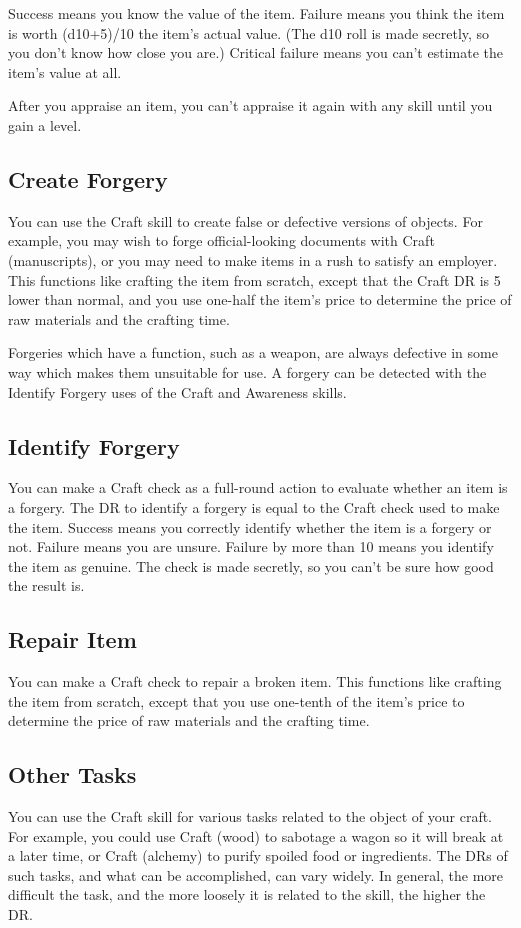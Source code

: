         Success means you know the value of the item. Failure means you think the item is worth (d10+5)/10 \mtimes the item's actual value. (The d10 roll is made secretly, so you don't know how close you are.) Critical failure means you can't estimate the item's value at all.

        After you appraise an item, you can't appraise it again with any skill until you gain a level.

    \subsection{Create Forgery}
        You can use the Craft skill to create false or defective versions of objects. For example, you may wish to forge official-looking documents with Craft (manuscripts), or you may need to make items in a rush to satisfy an employer. This functions like crafting the item from scratch, except that the Craft DR is 5 lower than normal, and you use one-half the item's price to determine the price of raw materials and the crafting time.

        Forgeries which have a function, such as a weapon, are always defective in some way which makes them unsuitable for use. A forgery can be detected with the Identify Forgery uses of the Craft and Awareness skills.

    \subsection{Identify Forgery}
        You can make a Craft check as a full-round action to evaluate whether an item is a forgery. The DR to identify a forgery is equal to the Craft check used to make the item. Success means you correctly identify whether the item is a forgery or not. Failure means you are unsure. Failure by more than 10 means you identify the item as genuine. The check is made secretly, so you can't be sure how good the result is.

    \subsection{Repair Item}
        You can make a Craft check to repair a broken item. This functions like crafting the item from scratch, except that you use one-tenth of the item's price to determine the price of raw materials and the crafting time.

    \subsection{Other Tasks}
        You can use the Craft skill for various tasks related to the object of your craft. For example, you could use Craft (wood) to sabotage a wagon so it will break at a later time, or Craft (alchemy) to purify spoiled food or ingredients. The DRs of such tasks, and what can be accomplished, can vary widely. In general, the more difficult the task, and the more loosely it is related to the skill, the higher the DR.

